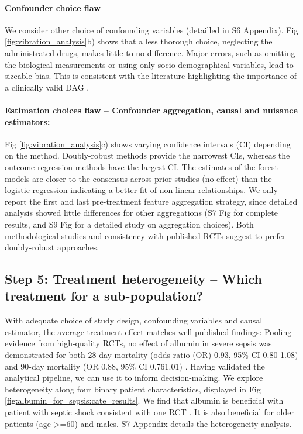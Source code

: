\documentclass[10pt,letterpaper]{article}
\begin{document}
\paragraph{Confounder choice flaw} We consider other choice of confounding variables
(detailled in S6 Appendix). Fig
\ref{fig:vibration_analysis}b) shows that a less thorough choice, neglecting
the administrated drugs, makes little to no difference. Major errors, such as
omitting the biological measurements or using only socio-demographical
variables, lead to sizeable bias. This is consistent with the literature
highlighting the importance of a clinically valid DAG \cite{greenland1999causal}.

\paragraph{Estimation choices flaw -- Confounder aggregation, causal and nuisance estimators:}

Fig \ref{fig:vibration_analysis}c) shows varying confidence intervals (CI)
depending on the method. Doubly-robust methods provide the narrowest CIs,
whereas the outcome-regression methods have the largest CI. The estimates of the
forest models are closer to the consensus across prior studies (no effect) than
the logistic regression indicating a better fit of non-linear relationships. We
only report the first and last pre-treatment feature aggregation strategy, since
detailed analysis showed little differences for other aggregations (S7 Fig for complete results, and S9 Fig for a detailed study on aggregation choices). Both methodological studies \cite{naimi2023challenges} and
consistency with published RCTs suggest to prefer doubly-robust approaches.

\subsection*{Step 5: Treatment heterogeneity -- Which treatment for a sub-population?}%
\label{sec:treamtent_heterogeneity_mimic_iv}


With adequate choice of study design, confounding variables and causal
estimator, the average treatment effect matches well published findings:
Pooling evidence from high-quality RCTs, no effect of albumin in severe
sepsis was demonstrated for both 28-day mortality (odds ratio (OR) 0.93,
95\% CI 0.80-1.08) and 90-day mortality (OR 0.88, 95\% CI 0.761.01)
\cite{xu2014comparison}.
%
Having validated the analytical pipeline, we can use it to inform
decision-making. We explore
heterogeneity along four binary patient characteristics, displayed in Fig
\ref{fig:albumin_for_sepsis:cate_results}. We find that albumin is beneficial
with patient with septic shock consistent with one
RCT  \cite{caironi2014albumin}. It is also beneficial for older patients (age >=60) and males. S7 Appendix details the heterogeneity analysis.
\end{document}
